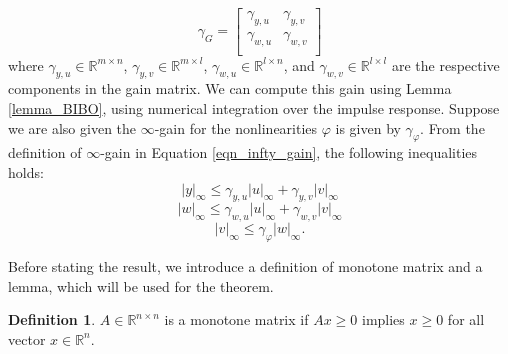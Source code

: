 \documentclass[journal]{IEEEtran}
\theoremstyle{definition}
\newtheorem{definition}{Definition}
\newtheorem{lemma}{Lemma}
\begin{document}
\begin{equation}
\gamma_G=\begin{bmatrix}
        \gamma_{y,u} & \gamma_{y,v} \\
        \gamma_{w,u} & \gamma_{w,v} \\
     \end{bmatrix}
\end{equation}
where $\gamma_{y,u}\in\mathbb{R}^{m\times n}$,  $\gamma_{y,v}\in\mathbb{R}^{m\times l}$,  $\gamma_{w,u}\in\mathbb{R}^{l\times n}$, and  $\gamma_{w,v}\in\mathbb{R}^{l\times l}$ are the respective components in the gain matrix. We can compute this gain using Lemma \ref{lemma_BIBO}, using numerical integration over the impulse response. Suppose we are also given the $\infty$-gain for the nonlinearities $\varphi$ is given by $\gamma_\varphi$. From the definition of $\infty$-gain in Equation  \ref{eqn_infty_gain}, the following inequalities holds:
\begin{equation}
|y|_\infty\leq\gamma_{y,u} |u|_\infty+\gamma_{y,v}|v|_\infty
\label{eqn_plant_y_gain}
\end{equation}
\begin{equation}
|w|_\infty\leq\gamma_{w,u} |u|_\infty+\gamma_{w,v}|v|_\infty
\label{eqn_plant_w_gain}
\end{equation}
\begin{equation}
|v|_\infty\leq\gamma_\varphi |w|_\infty.
\label{eqn_nonlinearity_gain}
\end{equation}

Before stating the result, we introduce a definition of monotone matrix and a lemma, which will be used for the theorem.

\begin{definition}
$A\in\mathbb{R}^{n\times n}$ is a monotone matrix if $Ax\geq 0$ implies $x\geq 0$ for all vector $x\in\mathbb{R}^{n}$.
\end{definition}

\end{document}
